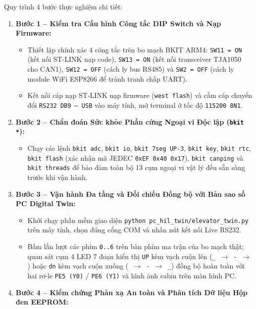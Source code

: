 Quy trình 4 bước thực nghiệm chi tiết:
\begin{enumerate}[nosep]
    \item \textbf{Bước 1 -- Kiểm tra Cấu hình Công tắc DIP Switch và Nạp Firmware:}
    \begin{itemize}[nosep]
        \item Thiết lập chính xác 4 công tắc trên bo mạch BKIT ARM4: \texttt{SW11 = ON} (kết nối ST-LINK nạp code), \texttt{SW13 = ON} (kết nối transceiver TJA1050 cho CAN1), \texttt{SW12 = OFF} (cách ly bus RS485) và \texttt{SW2 = OFF} (cách ly module WiFi ESP8266 để tránh tranh chấp UART).
        \item Kết nối cáp nạp ST-LINK nạp firmware (\texttt{west flash}) và cắm cáp chuyển đổi \texttt{RS232 DB9 -- USB} vào máy tính, mở terminal ở tốc độ \texttt{115200 8N1}.
    \end{itemize}
    \item \textbf{Bước 2 -- Chẩn đoán Sức khỏe Phần cứng Ngoại vi Độc lập (\texttt{bkit *}):}
    \begin{itemize}[nosep]
        \item Chạy các lệnh \texttt{bkit adc}, \texttt{bkit io}, \texttt{bkit 7seg UP-3}, \texttt{bkit key}, \texttt{bkit rtc}, \texttt{bkit flash} (xác nhận mã JEDEC \texttt{0xEF 0x40 0x17}), \texttt{bkit canping} và \texttt{bkit threads} để bảo đảm toàn bộ 13 cụm ngoại vi vật lý đều sẵn sàng trước khi vận hành.
    \end{itemize}
    \item \textbf{Bước 3 -- Vận hành Đa tầng và Đối chiếu Đồng bộ với Bản sao số PC Digital Twin:}
    \begin{itemize}[nosep]
        \item Khởi chạy phần mềm giao diện \texttt{python pc\_hil\_twin/elevator\_twin.py} trên máy tính, chọn đúng cổng COM và nhấn nút kết nối Live RS232.
        \item Bấm lần lượt các phím \texttt{0..6} trên bàn phím ma trận của bo mạch thật; quan sát cụm 4 LED 7 đoạn hiển thị \texttt{UP} kèm vạch cuộn lên (\texttt{\_ $\rightarrow$ - $\rightarrow$ \textasciimacron}) hoặc \texttt{dn} kèm vạch cuộn xuống (\texttt{\textasciimacron\ $\rightarrow$ - $\rightarrow$ \_}) đồng bộ hoàn toàn với hai rơ-le \texttt{PE5 (Y0)} / \texttt{PE6 (Y1)} và hình ảnh cabin trên màn hình PC.
    \end{itemize}
    \item \textbf{Bước 4 -- Kiểm chứng Phản xạ An toàn và Phân tích Dữ liệu Hộp đen EEPROM:}
    \begin{itemize}[nosep]

\end{itemize}
\end{enumerate}

